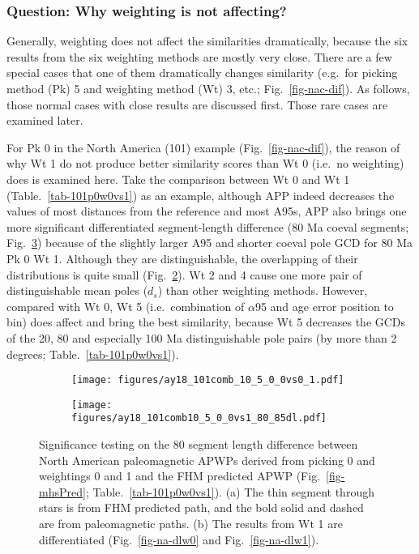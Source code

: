 \subsubsection{Question: Why weighting is not affecting?}

Generally, weighting does not affect the similarities dramatically, because the
six results from the six weighting methods are mostly very close. There are a
few special cases that one of them dramatically changes similarity (e.g.\ for
picking method (Pk) 5 and weighting method (Wt) 3, etc.;
Fig.~\ref{fig-nac-dif}). As follows, those normal cases with close results are
discussed first. Those rare cases are examined later.

For Pk 0 in the North America (101) example (Fig.~\ref{fig-nac-dif}), the reason
of why Wt 1 do not produce better similarity scores than Wt 0 (i.e.\
no weighting) does is examined here. Take the comparison between Wt 0 and Wt 1
(Table.~\ref{tab-101p0w0vs1}) as an example, although APP indeed decreases the
values of most distances from the reference and most A95s, APP also brings one
more significant differentiated segment-length difference (80\textendash85 Ma
coeval segments; Fig.~\ref{fig-101_8085}) because of the slightly larger A95 and
shorter coeval pole GCD for 80 Ma Pk 0 Wt 1. Although they are distinguishable,
the overlapping of their distributions is quite small
(Fig.~\ref{fig-nac105_00vs01dl}). Wt 2 and 4 cause one more pair of
distinguishable mean poles ($d_s$) than other weighting methods. However,
compared with Wt 0, Wt 5 (i.e.\ combination of $\alpha$95 and age error position
to bin) does affect and bring the best similarity, because Wt 5 decreases the
GCDs of the 20, 80 and especially 100 Ma distinguishable pole pairs (by more
than 2 degrees; Table.~\ref{tab-101p0w0vs1}).

\begin{figure}
\captionsetup[subfigure]{singlelinecheck=off,justification=raggedright,aboveskip=-6pt,belowskip=-6pt}
	\centering
	\begin{subfigure}{.49\textwidth}
		\caption{}\label{fig-nac105_00vs01}
		\texttt{[image: figures/ay18\_101comb\_10\_5\_0\_0vs0\_1.pdf]}
	\end{subfigure}
	\vspace{1em}
	\begin{subfigure}{.49\textwidth}
		\caption{}\label{fig-nac105_00vs01dl}
		\texttt{[image: figures/ay18\_101comb10\_5\_0\_0vs1\_80\_85dl.pdf]}
	\end{subfigure}
	\caption[101 10 5 0 0 vs 0 1 80 Ma dl]{Significance testing on
the 80\textendash85 segment length difference between North American
paleomagnetic APWPs derived from picking 0 and weightings 0 and 1 and the FHM
predicted APWP (Fig.~\ref{fig-mhsPred}; Table.~\ref{tab-101p0w0vs1}). (a) The
thin segment through stars is from FHM predicted path, and the bold solid and
dashed are from paleomagnetic paths. (b) The results from Wt 1 are
differentiated (Fig.~\ref{fig-na-dlw0} and
Fig.~\ref{fig-na-dlw1}).}\label{fig-101_8085}
\end{figure}

